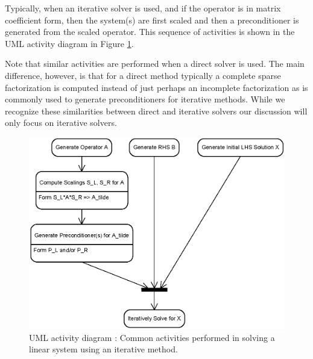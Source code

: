 \documentclass[pdf,ps2pdf,11pt]{SANDreport}
\begin{document}
Typically, when an iterative solver is used, and if the operator is in
matrix coefficient form, then the system(s) are first scaled and then
a preconditioner is generated from the scaled operator.  This sequence
of activities is shown in the UML {}\cite{ref:booch_et_al_1999}
activity diagram in Figure
{}\ref{belos:fig:GeneralLinearSolveActivities}.

Note that similar activities are performed when a direct solver is
used.  The main difference, however, is that for a direct method
typically a complete sparse factorization is computed instead of just
perhaps an incomplete factorization as is commonly used to generate
preconditioners for iterative methods.  While we recognize these
similarities between direct and iterative solvers our discussion will
only focus on iterative solvers.

{\bsinglespace
\begin{figure}[t]
\begin{center}
\includegraphics*[scale=0.85]{GeneralLinearSolveActivities}
\end{center}
\caption{
\label{belos:fig:GeneralLinearSolveActivities}
UML activity diagram : Common activities
performed in solving a linear system using an iterative method.}
\end{figure}
\esinglespace}
\end{document}
